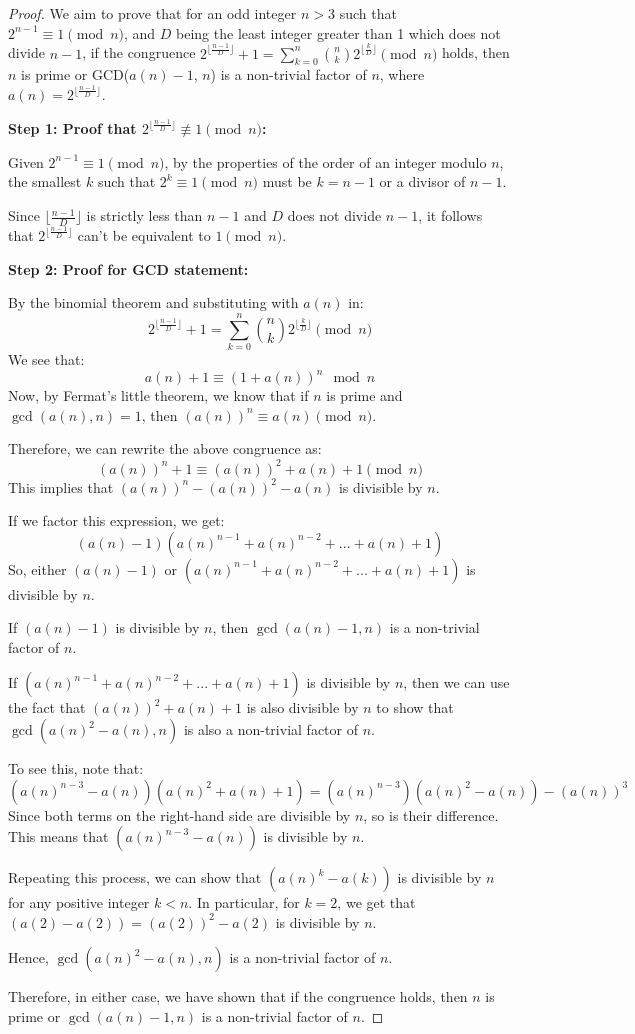 \begin{proof}
We aim to prove that for an odd integer $n > 3$ such that $2^{n-1} \equiv 1 \pmod{n}$, and $D$ being the least integer greater than 1 which does not divide $n-1$, if the congruence $2^{\lfloor\frac{n-1}{D}\rfloor} + 1 = \sum_{k=0}^{n}\binom{n}{k}2^{\lfloor\frac{k}{D}\rfloor} \pmod{n}$ holds, then $n$ is prime or GCD($a(n) - 1$, $n$) is a non-trivial factor of $n$, where $a(n) = 2^{\lfloor\frac{n-1}{D}\rfloor}$.

\textbf{Step 1: Proof that $2^{\lfloor\frac{n-1}{D}\rfloor} \not\equiv 1 \pmod{n}$:}

Given $2^{n-1} \equiv 1 \pmod{n}$, by the properties of the order of an integer modulo $n$, the smallest $k$ such that $2^k \equiv 1 \pmod{n}$ must be $k = n-1$ or a divisor of $n-1$.

Since $\lfloor\frac{n-1}{D}\rfloor$ is strictly less than $n-1$ and $D$ does not divide $n-1$, it follows that $2^{\lfloor\frac{n-1}{D}\rfloor}$ can't be equivalent to $1 \pmod{n}$.

\textbf{Step 2: Proof for GCD statement:}

By the binomial theorem and substituting with $a(n)$ in:
\[
2^{\lfloor\frac{n-1}{D}\rfloor} + 1 = \sum_{k=0}^{n}\binom{n}{k}2^{\lfloor\frac{k}{D}\rfloor} \pmod{n}
\]
We see that:
\[
a(n) + 1 \equiv (1 + a(n))^n \mod n
\]
Now, by Fermat's little theorem, we know that if $n$ is prime and $\gcd(a(n), n) = 1$, then $(a(n))^n \equiv a(n) \pmod{n}$.

Therefore, we can rewrite the above congruence as:
\[
(a(n))^n + 1 \equiv (a(n))^2 + a(n) + 1 \pmod{n}
\]
This implies that $(a(n))^n - (a(n))^2 - a(n)$ is divisible by $n$. 

If we factor this expression, we get:
\[
(a(n) - 1)(a(n)^{n-1} + a(n)^{n-2} + ... + a(n) + 1)
\]
So, either $(a(n) - 1)$ or $(a(n)^{n-1} + a(n)^{n-2} + ... + a(n) + 1)$ is divisible by $n$. 

If $(a(n) - 1)$ is divisible by $n$, then $\gcd(a(n) - 1, n)$ is a non-trivial factor of $n$. 

If $(a(n)^{n-1} + a(n)^{n-2} + ... + a(n) + 1)$ is divisible by $n$, then we can use the fact that $(a(n))^2 + a(n) + 1$ is also divisible by $n$ to show that $\gcd(a(n)^2 - a(n), n)$ is also a non-trivial factor of $n$. 

To see this, note that:
\[
(a(n)^{n-3} - a(n))(a(n)^2 + a(n) + 1) = (a(n)^{n-3})(a(n)^2 - a(n)) - (a(n))^3
\]
Since both terms on the right-hand side are divisible by $n$, so is their difference. This means that $(a(n)^{n-3} - a(n))$ is divisible by $n$. 

Repeating this process, we can show that $(a(n)^{k} - a(k))$ is divisible by $n$ for any positive integer $k < n$. In particular, for $k = 2$, we get that $(a(2) - a(2)) = (a(2))^2 - a(2)$ is divisible by $n$. 

Hence, $\gcd(a(n)^2 - a(n), n)$ is a non-trivial factor of $n$. 

Therefore, in either case, we have shown that if the congruence holds, then $n$ is prime or $\gcd(a(n) - 1, n)$ is a non-trivial factor of $n$.
\end{proof}